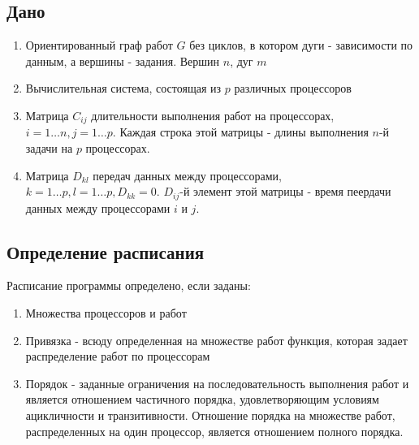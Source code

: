 \subsection*{Дано}
\begin{enumerate}
    \item Ориентированный граф работ $G$ без циклов, в котором дуги - зависимости по данным, а вершины - задания. Вершин $n$, дуг $m$
    \item Вычислительная система, состоящая из $p$ различных процессоров
    \item Матрица $C_{ij}$ длительности выполнения работ на процессорах, $i=1 \dots n, j=1 \dots p$. Каждая строка этой матрицы - длины выполнения $n$-й задачи на $p$ процессорах. 
    \item Матрица $D_{kl}$ передач данных между процессорами, $k=1 \dots p, l = 1 \dots p, D_{kk} = 0$. $D_{ij}$-й элемент этой матрицы - время пеердачи данных между процессорами $i$ и $j$.
\end{enumerate}
\subsection*{Определение расписания}
Расписание программы определено, если заданы:
\begin{enumerate}
    \item Множества процессоров и работ
    \item Привязка - всюду определенная на множестве работ функция, которая задает распределение работ по процессорам
    \item Порядок - заданные ограничения на последовательность выполнения работ и является отношением частичного порядка, удовлетворяющим условиям ацикличности и транзитивности. Отношение порядка на множестве работ, распределенных на один процессор, является отношением полного порядка.
\end{enumerate}

